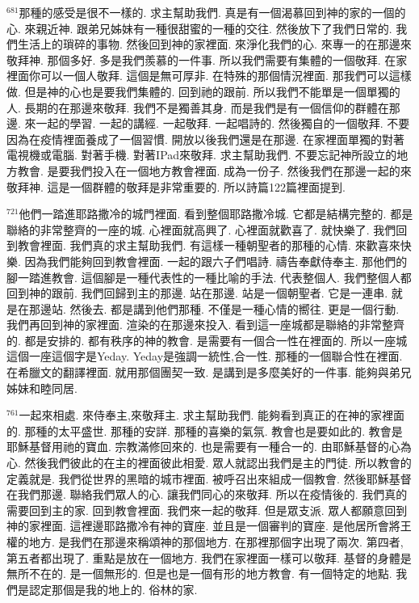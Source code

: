 \documentclass{book}
\begin{document}
$^{681}$那種的感受是很不一樣的.
求主幫助我們.
真是有一個渴慕回到神的家的一個的心.
來親近神.
跟弟兄姊妹有一種很甜蜜的一種的交往.
然後放下了我們日常的.
我們生活上的瑣碎的事物.
然後回到神的家裡面.
來淨化我們的心.
來專一的在那邊來敬拜神.
那個多好.
多是我們羨慕的一件事.
所以我們需要有集體的一個敬拜.
在家裡面你可以一個人敬拜.
這個是無可厚非.
在特殊的那個情況裡面.
那我們可以這樣做.
但是神的心也是要我們集體的.
回到祂的跟前.
所以我們不能單是一個單獨的人.
長期的在那邊來敬拜.
我們不是獨善其身.
而是我們是有一個信仰的群體在那邊.
來一起的學習.
一起的講經.
一起敬拜.
一起唱詩的.
然後獨自的一個敬拜.
不要因為在疫情裡面養成了一個習慣.
開放以後我們還是在那邊.
在家裡面單獨的對著電視機或電腦.
對著手機.
對著IPad來敬拜.
求主幫助我們.
不要忘記神所設立的地方教會.
是要我們投入在一個地方教會裡面.
成為一份子.
然後我們在那邊一起的來敬拜神.
這是一個群體的敬拜是非常重要的.
所以詩篇122篇裡面提到.

$^{721}$他們一踏進耶路撒冷的城門裡面.
看到整個耶路撒冷城.
它都是結構完整的.
都是聯絡的非常整齊的一座的城.
心裡面就高興了.
心裡面就歡喜了.
就快樂了.
我們回到教會裡面.
我們真的求主幫助我們.
有這樣一種朝聖者的那種的心情.
來歡喜來快樂.
因為我們能夠回到教會裡面.
一起的跟六子們唱詩.
禱告奉獻侍奉主.
那他們的腳一踏進教會.
這個腳是一種代表性的一種比喻的手法.
代表整個人.
我們整個人都回到神的跟前.
我們回歸到主的那邊.
站在那邊.
站是一個朝聖者.
它是一連串.
就是在那邊站.
然後去.
都是講到他們那種.
不僅是一種心情的嚮往.
更是一個行動.
我們再回到神的家裡面.
渲染的在那邊來投入.
看到這一座城都是聯絡的非常整齊的.
都是安排的.
都有秩序的神的教會.
是需要有一個合一性在裡面的.
所以一座城這個一座這個字是Yeday.
Yeday是強調一統性,合一性.
那種的一個聯合性在裡面.
在希臘文的翻譯裡面.
就用那個團契一致.
是講到是多麼美好的一件事.
能夠與弟兄姊妹和睦同居.

$^{761}$一起來相處.
來侍奉主,來敬拜主.
求主幫助我們.
能夠看到真正的在神的家裡面的.
那種的太平盛世.
那種的安詳.
那種的喜樂的氣氛.
教會也是要如此的.
教會是耶穌基督用祂的寶血.
宗教滿修回來的.
也是需要有一種合一的.
由耶穌基督的心為心.
然後我們彼此的在主的裡面彼此相愛.
眾人就認出我們是主的門徒.
所以教會的定義就是.
我們從世界的黑暗的城市裡面.
被呼召出來組成一個教會.
然後耶穌基督在我們那邊.
聯絡我們眾人的心.
讓我們同心的來敬拜.
所以在疫情後的.
我們真的需要回到主的家.
回到教會裡面.
我們來一起的敬拜.
但是眾支派.
眾人都願意回到神的家裡面.
這裡邊耶路撒冷有神的寶座.
並且是一個審判的寶座.
是他居所會將王權的地方.
是我們在那邊來稱頌神的那個地方.
在那裡那個字出現了兩次.
第四者,第五者都出現了.
重點是放在一個地方.
我們在家裡面一樣可以敬拜.
基督的身體是無所不在的.
是一個無形的.
但是也是一個有形的地方教會.
有一個特定的地點.
我們是認定那個是我的地上的.
俗林的家.
\end{document}
